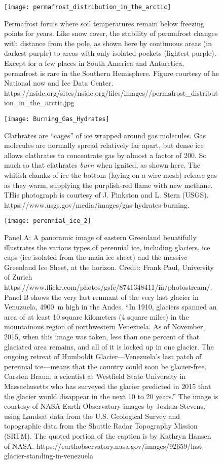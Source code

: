 \documentclass[amstex,12pt]{book}
\begin{document}
\begin{figure}[p]
	\centering
  \texttt{[image: permafrost\_distribution\_in\_the\_arctic]}%
	\caption{Permafrost forms where soil temperatures remain below freezing points for years. Like snow cover, the stability of permafrost changes with distance from the pole, as shown here by continuous areas (in darkest purple) to areas with only isolated pockets (lightest purple). Except for a few places in South America and Antarctica, permafrost is rare in the Southern Hemisphere. Figure courtesy of he National now and Ice Data Center. https://nsidc.org/sites/nsidc.org/files/images//permafrost\_distribution\_in\_the\_arctic.jpg }
	\label{fig:permafrost}
\end{figure}

\begin{figure}[p]
	\centering
  \texttt{[image: Burning\_Gas\_Hydrates]}%
	\caption{Clathrates are ``cages'' of ice wrapped around gas molecules. Gas molecules are normally spread relatively far apart, but dense ice allows clathrates to concentrate gas by almost a factor of 200. So much so that clathrates \emph{burn} when ignited, as shown here. The whitish chunks of ice the bottom (laying on a wire mesh) release gas as they warm, supplying the purplish-red flame with new methane. THis photograph is courtesy of J. Pinkston and L. Stern (USGS). https://www.usgs.gov/media/images/gas-hydrates-burning.}
	\label{fig:clath_fire}
\end{figure}

\begin{figure}[p]
	\centering
  \texttt{[image: perennial\_ice\_2]}%
	\caption{Panel A: A panoramic image of eastern Greenland beuatifully illustrates the various types of perennial ice, including glaciers, ice caps (ice isolated from the main ice sheet) and the massive Greenland Ice Sheet, at the horizon. Credit: Frank Paul, University of Zurich https://www.flickr.com/photos/gsfc/8741348411/in/photostream/. Panel B shows the very last remnant of the very last glacier in Venuzuela, \SI{4900}{\metre} high in the Andes. ``In 1910, glaciers spanned an area of at least 10 square kilometers (4 square miles) in the mountainous region of northwestern Venezuela. As of November, 2015, when this image was taken, less than one percent of that glaciated area remains, and all of it is locked up in one glacier. The ongoing retreat of Humboldt Glacier—Venezuela’s last patch of perennial ice—means that the country could soon be glacier-free. Carsten Braun, a scientist at Westfield State University in Massachusetts who has surveyed the glacier predicted in 2015 that the glacier would disappear in the next 10 to 20 years.'' The image is courtesy of NASA Earth Observatory images by Joshua Stevens, using Landsat data from the U.S. Geological Survey and topographic data from the Shuttle Radar Topography Mission (SRTM). The quoted portion of the caption is by Kathryn Hansen of NASA. https://earthobservatory.nasa.gov/images/92659/last-glacier-standing-in-venezuela}
	\label{fig:perennial_ice_2}
\end{figure}
\end{document}
